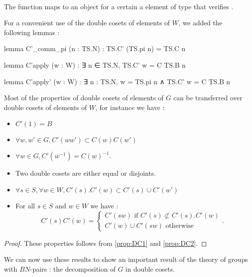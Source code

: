\begin{commentary} ~\\
\noindent
The function   maps to an object  for a certain  a element of type  that verifies .
\end{commentary}

For a convenient use of the double cosets of elements of $W$, we added the following lemmas :

\begin{leancode}
lemma C'_comm_pi (n : TS.N) : TS.C' (TS.pi n) = TS.C n 

lemma C'apply (w : W) : ∃ n ∈ TS.N, TS.C' w = C TS.B n 

lemma C'apply' (w : W) : ∃ n : TS.N, w = TS.pi n ∧ TS.C' w = C TS.B n
\end{leancode}

Most of the properties of double cosets of elements of $G$ can be transferred over double cosets of elements of $W$, for instance we have : 

\begin{proprietes} \label{prop:DC3}
    \begin{itemize}
        \item  $C'\left( 1 \right) = B$
        \item $\forall w,w'\in G, C'\left( w w' \right) \subset C(w) C(w')$
        \item $\forall w \in G, C'\left( w^{-1} \right) = C\left( w \right)^{-1}$.
        \item Two double cosets are either equal or disjoints.
\item $\forall s \in S, \forall w \in W, C'(s). C'(w) \subset C'(s) \cup  C'(w')$
\item For all $s \in S$ and $w \in W$ we have :
     \[
     C'(s) C'(w) = \begin{cases}
         C'(sw) \text{ if } C'(s) \not \subset C'(s).C'(w)\\
         C'(w) \cup C'(sw) \text{ otherwise}
     \end{cases}
     .\] 
    \end{itemize}
\end{proprietes} 

\begin{proof}
    These properties follows from \ref{prop:DC1} and \ref{prop:DC2}.
\end{proof}

We can now use these results to show an important result of the theory of groups with $BN$-pairs : the decomposition of $G$ in double cosets.

